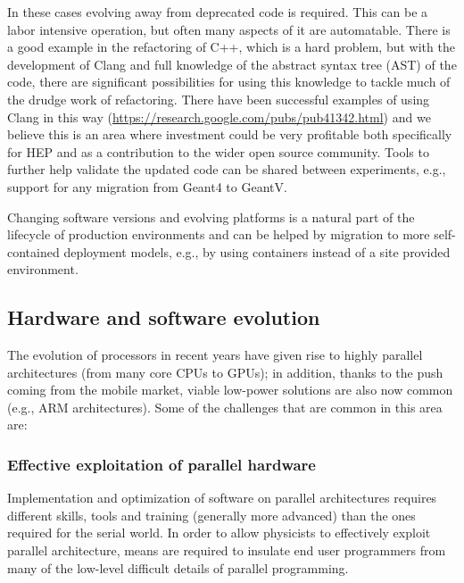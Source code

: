\documentclass[12pt,a4paper]{article}
\begin{document}
In these cases evolving away from deprecated code is required. This can
be a labor intensive operation, but often many aspects of it are
automatable. There is a good example in the refactoring of C++, which is
a hard problem, but with the development of Clang and full knowledge of
the abstract syntax tree (AST) of the code, there are significant
possibilities for using this knowledge to tackle much of the drudge work
of refactoring. There have been successful examples of using Clang in
this way
(\href{https://research.google.com/pubs/pub41342.html}{{https://research.google.com/pubs/pub41342.html}})
and we believe this is an area where investment could be very profitable
both specifically for HEP and as a contribution to the wider open source
community. Tools to further help validate the updated code can be shared
between experiments, e.g., support for any migration from Geant4 to
GeantV.

Changing software versions and evolving platforms is a natural part of
the lifecycle of production environments and can be helped by migration
to more self-contained deployment models, e.g., by using containers
instead of a site provided environment.

\hypertarget{hardware-and-software-evolution}{%
\subsection{Hardware and software
evolution}\label{hardware-and-software-evolution}}

The evolution of processors in recent years have given rise to highly
parallel architectures (from many core CPUs to GPUs); in addition,
thanks to the push coming from the mobile market, viable low-power
solutions are also now common (e.g., ARM architectures). Some of the
challenges that are common in this area are:

\hypertarget{effective-exploitation-of-parallel-hardware}{%
\subsubsection{Effective exploitation of parallel
hardware}\label{effective-exploitation-of-parallel-hardware}}

Implementation and optimization of software on parallel architectures
requires different skills, tools and training (generally more advanced)
than the ones required for the serial world. In order to allow
physicists to effectively exploit parallel architecture, means are
required to insulate end user programmers from many of the low-level
difficult details of parallel programming.
\end{document}
